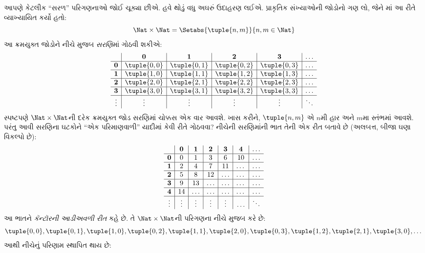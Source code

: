 \begingroup
\makeatletter{}\makeatother


\label{guunit:OLP-0030}


\begin{explain}
આપણે કેટલીક “સરળ” પરિગણનાઓ જોઈ ચૂક્યા છીએ. હવે
થોડું વધુ અઘરું ઉદાહરણ લઈએ. પ્રાકૃતિક સંખ્યાઓની
જોડોનો ગણ લો, જેને
માં આ રીતે વ્યાખ્યાયિત કર્યો હતો:
\[
\Nat \times \Nat = \Setabs{\tuple{n,m}}{n,m \in \Nat}
\]
આ ક્રમયુક્ત જોડોને નીચે મુજબ \emph{સરણિ}માં ગોઠવી શકીએ:
\[
\begin{array}{ c | c | c | c | c | c}
& \mathbf 0 & \mathbf 1 & \mathbf 2 & \mathbf 3 & \dots \\
\hline
\mathbf 0 & \tuple{0,0} & \tuple{0,1} & \tuple{0,2} & \tuple{0,3} & \dots \\
\hline
\mathbf 1 & \tuple{1,0} & \tuple{1,1} & \tuple{1,2} & \tuple{1,3} & \dots \\
\hline
\mathbf 2 & \tuple{2,0} & \tuple{2,1} & \tuple{2,2} & \tuple{2,3} & \dots \\
\hline
\mathbf 3 & \tuple{3,0} & \tuple{3,1} & \tuple{3,2} & \tuple{3,3} & \dots \\
\hline
\vdots & \vdots & \vdots & \vdots & \vdots & \ddots\\
\end{array}
\]
સ્પષ્ટપણે $\Nat \times \Nat$ની દરેક ક્રમયુક્ત જોડ
સરણિમાં ચોક્કસ એક વાર આવશે. ખાસ કરીને,
$\tuple{n,m}$ એ $n$મી હાર અને $m$મા સ્તંભમાં આવશે.
પરંતુ આવી સરણિના ઘટકોને “એક પરિમાણવાળી” યાદીમાં
કેવી રીતે ગોઠવવા? નીચેની સરણિમાંની ભાત તેની એક રીત
બતાવે છે (અલબત્ત, બીજા ઘણા વિકલ્પો છે):
\[
\begin{array}{ c | c | c | c | c | c | c}
& \mathbf 0 & \mathbf 1 & \mathbf 2 & \mathbf 3 & \mathbf 4 &\dots \\
\hline
\mathbf 0 & 0  & 1& 3 & 6& 10 &\ldots \\
\hline
\mathbf 1 &2 & 4& 7 & 11 & \dots &\ldots \\
\hline
\mathbf 2 & 5 & 8 & 12 & \ldots & \dots&\ldots \\
\hline
\mathbf 3 & 9 & 13 & \ldots & \ldots & \dots & \ldots \\
\hline
\mathbf 4 & 14 & \ldots & \ldots & \ldots & \dots & \ldots \\
\hline
\vdots & \vdots & \vdots & \vdots & \vdots&\ldots & \ddots\\
\end{array}
\]\noindent
આ ભાતને \emph{કૅન્ટૉરની આડીઅવળી રીત} કહે છે.
તે $\Nat \times \Nat$ની પરિગણના નીચે મુજબ કરે છે:
\[
\tuple{0,0}, \tuple{0,1}, \tuple{1,0}, \tuple{0,2}, \tuple{1,1},
\tuple{2,0}, \tuple{0,3}, \tuple{1,2}, \tuple{2,1}, \tuple{3,0}, \dots
\]
આથી નીચેનું પરિણામ સ્થાપિત થાય છે:
\end{explain}

